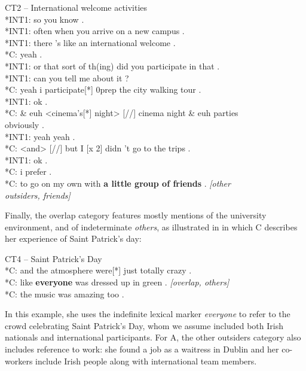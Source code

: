 \documentclass[output=paper]{langscibook}
\begin{document}
\ea%
    \label{ex:14}
    CT2 – International welcome activities\medskip\\
	*INT1: \tab so you know .\\
	*INT1: \tab often when you arrive on a new campus . \\
	*INT1: \tab there 's like an international welcome .\\
	*C: \tab yeah .\\
	*INT1: \tab or that sort of th(ing) did you participate in that .\\
	*INT1: \tab can you tell me about it ?\\
	*C: \tab yeah i participate[*] 0prep the city walking tour .\\
	*INT1: \tab ok .\\
	*C: \tab \& euh <cinema's[*] night> [//] cinema night \& euh parties\\ \tab obviously .\\
	*INT1: \tab yeah yeah .\\
    *C: \tab <and> [//] but I [x 2] didn 't go to the trips .\\
    *INT1: \tab ok .\\
    *C: \tab i prefer .\\
    *C: \tab to go on my own with \textbf{a little group of friends} . \textit{[other\\ \tab outsiders, friends]}\\
\z

Finally, the overlap category features mostly mentions of the university environment, and of indeterminate \textit{others}, as illustrated in  in which C describes her experience of Saint Patrick’s day:

\ea%
\label{ex:15}CT4 – Saint Patrick’s Day\medskip\\
*C: \tab  and the atmosphere were[*] just totally crazy .\\
*C: \tab like \textbf{everyone} was dressed up in green . \textit{[overlap, others]}\\
*C: \tab the music was amazing too .
\z

In this example, she uses the indefinite lexical marker \textit{everyone} to refer to the crowd celebrating Saint Patrick’s Day, whom we assume included both Irish nationals and international participants. For A, the other outsiders category also includes reference to work: she found a job as a waitress in Dublin and her co-workers include Irish people along with international team members.
\end{document}

